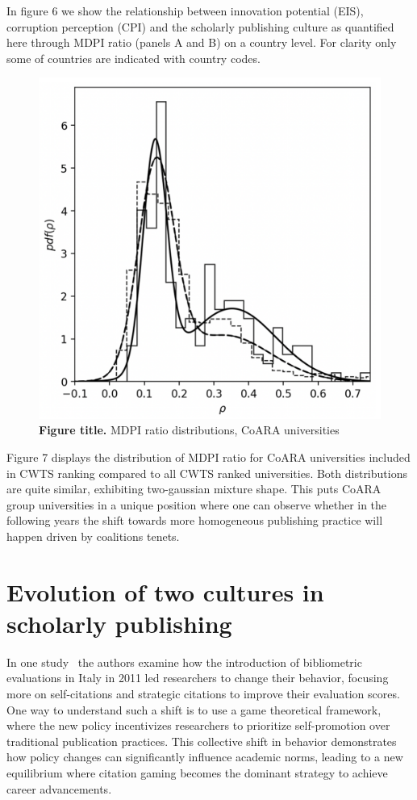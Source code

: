 \documentclass[amsfonts, amssymb, prl, superscriptaddress, notitlepage, twocolumn, nofootinbib]{revtex4-2}
\begin{document}
In figure 6 we show the relationship between innovation potential (EIS), corruption perception (CPI) and the scholarly publishing culture as quantified here through MDPI ratio (panels A and B) on a country level. For clarity only some of countries are indicated with country codes.

\begin{figure}
    \centering
    \includegraphics[width=.6\linewidth]{Fig05f.png}
    \caption{\label{fig:fig7} {\bf Figure title.} MDPI ratio distributions, CoARA universities  
}
\end{figure}

Figure 7 displays the distribution of MDPI ratio for CoARA universities included in CWTS ranking compared to all CWTS ranked universities. Both distributions are quite similar, exhibiting two-gaussian mixture shape. This puts CoARA group universities in a unique position where one can observe whether in the following years the shift towards more homogeneous publishing practice will happen driven by coalitions tenets.   

\section{Evolution of two cultures in scholarly publishing }
In one study~\cite{baccini2019citation} the authors examine how the introduction of bibliometric evaluations in Italy in 2011 led researchers to change their behavior, focusing more on self-citations and strategic citations to improve their evaluation scores. One way to understand such a shift is to use a game theoretical framework, where the new policy incentivizes researchers to prioritize self-promotion over traditional publication practices. This collective shift in behavior demonstrates how policy changes can significantly influence academic norms, leading to a new equilibrium where citation gaming becomes the dominant strategy to achieve career advancements. 
\end{document}
